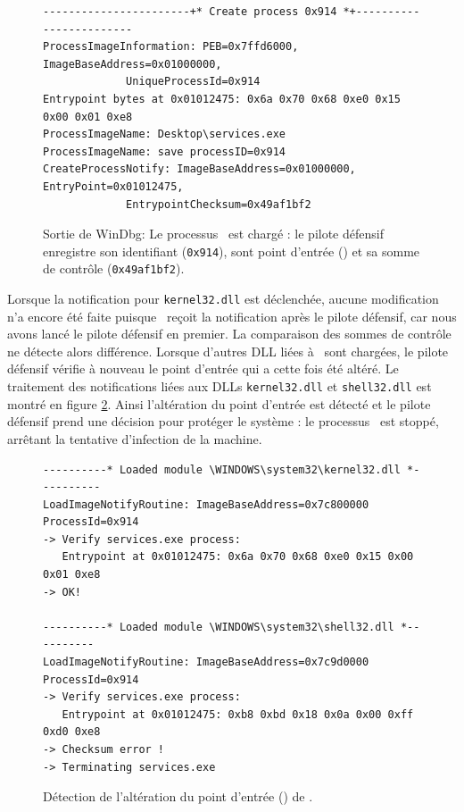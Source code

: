 \begin{figure}[h]
\begin{center}
\scriptsize
\begin{lstlisting}[language={}]
-----------------------+* Create process 0x914 *+------------------------
ProcessImageInformation: PEB=0x7ffd6000, ImageBaseAddress=0x01000000,
			 UniqueProcessId=0x914 
Entrypoint bytes at 0x01012475: 0x6a 0x70 0x68 0xe0 0x15 0x00 0x01 0xe8
ProcessImageName: Desktop\services.exe
ProcessImageName: save processID=0x914
CreateProcessNotify: ImageBaseAddress=0x01000000, EntryPoint=0x01012475,
		     EntrypointChecksum=0x49af1bf2
\end{lstlisting}
\end{center}
\caption{Sortie de WinDbg: Le processus \services\ est chargé : le pilote défensif enregistre son identifiant (\texttt{0x914}), sont point d'entrée () et sa somme de contrôle (\texttt{0x49af1bf2}).\label{fig:Breakpoint1}}
\end{figure}

Lorsque la notification pour \texttt{kernel32.dll} est déclenchée, aucune modification n'a encore été faite puisque \duqu\ reçoit la notification après le pilote défensif, car nous avons lancé le pilote défensif en premier.
La comparaison des sommes de contrôle ne détecte alors différence.
Lorsque d'autres DLL liées à \services\ sont chargées, le pilote défensif vérifie à nouveau le point d'entrée qui a cette fois été altéré.
Le traitement des notifications liées aux DLLs \texttt{kernel32.dll} et \texttt{shell32.dll} est montré en figure \ref{fig:Breakpoint2}.
Ainsi l'altération du point d'entrée est détecté et le pilote défensif prend une décision pour protéger le système : le processus \services\ est stoppé, arrêtant la tentative d'infection de la machine.


\begin{figure}[h]
\begin{center}
\scriptsize
\begin{lstlisting}[language={}]
----------* Loaded module \WINDOWS\system32\kernel32.dll *----------
LoadImageNotifyRoutine: ImageBaseAddress=0x7c800000 ProcessId=0x914 
-> Verify services.exe process: 
   Entrypoint at 0x01012475: 0x6a 0x70 0x68 0xe0 0x15 0x00 0x01 0xe8
-> OK!

----------* Loaded module \WINDOWS\system32\shell32.dll *----------
LoadImageNotifyRoutine: ImageBaseAddress=0x7c9d0000 ProcessId=0x914 
-> Verify services.exe process:
   Entrypoint at 0x01012475: 0xb8 0xbd 0x18 0x0a 0x00 0xff 0xd0 0xe8
-> Checksum error !
-> Terminating services.exe
\end{lstlisting}
\end{center}
\caption{Détection de l'altération du point d'entrée () de \services.\label{fig:Breakpoint2}}
\end{figure}

